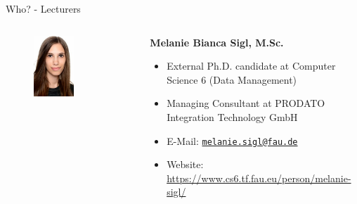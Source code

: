 \begin{frame}{Who? - Lecturers}
	\begin{columns}[T]
		\begin{column}{0.2\textwidth}
			\vspace{-1em}
			\begin{figure}[T]
				\centering
				\includegraphics[width=0.55\textwidth]{img/melanie_b_sigl.jpg}
			\end{figure}
		\end{column}
		\begin{column}{0.8\textwidth}
			\textbf{Melanie Bianca Sigl, M.Sc.}
			\begin{itemize}
				\item External Ph.D. candidate at Computer Science 6 (Data Management)
				\item Managing Consultant at PRODATO Integration Technology GmbH
				\item E-Mail: \texttt{\href{mailto:melanie.sigl@fau.de}{melanie.sigl@fau.de}}
				\item Website: \url{https://www.cs6.tf.fau.eu/person/melanie-sigl/}
			\end{itemize}
		\end{column}
	\end{columns}

	\vspace{2em}


\end{frame}

